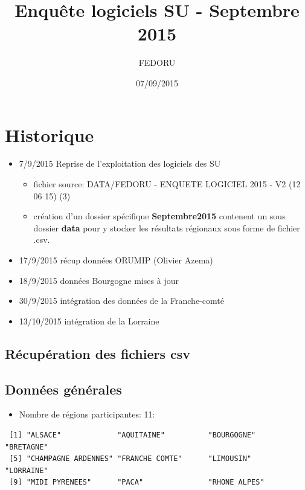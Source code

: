 \documentclass[]{article}
\title{Enquête logiciels SU - Septembre 2015}
\author{FEDORU}
\date{07/09/2015}
\begin{document}
\maketitle


{
\hypersetup{linkcolor=black}
\setcounter{tocdepth}{2}
\tableofcontents
}
\section{Historique}\label{historique}

\begin{itemize}
\item
  7/9/2015 Reprise de l'exploitation des logiciels des SU

  \begin{itemize}
  \itemsep1pt\parskip0pt
  \item
    fichier source: DATA/FEDORU - ENQUETE LOGICIEL 2015 - V2 (12 06 15)
    (3)
  \item
    création d'un dossier spécifique \textbf{Septembre2015} contenent un
    sous dossier \textbf{data} pour y stocker les résultats régionaux
    sous forme de fichier .csv.
  \end{itemize}
\item
  17/9/2015 récup données ORUMIP (Olivier Azema)
\item
  18/9/2015 données Bourgogne mises à jour
\item
  30/9/2015 intégration des données de la Franche-comté
\item
  13/10/2015 intégration de la Lorraine
\end{itemize}

\subsection{Récupération des fichiers
csv}\label{recuperation-des-fichiers-csv}

\subsection{Données générales}\label{donnees-generales}

\begin{itemize}
\itemsep1pt\parskip0pt
\item
  Nombre de régions participantes: 11:
\end{itemize}

\begin{verbatim}
 [1] "ALSACE"             "AQUITAINE"          "BOURGOGNE"          "BRETAGNE"          
 [5] "CHAMPAGNE ARDENNES" "FRANCHE COMTE"      "LIMOUSIN"           "LORRAINE"          
 [9] "MIDI PYRENEES"      "PACA"               "RHONE ALPES"       
\end{verbatim}
\end{document}
